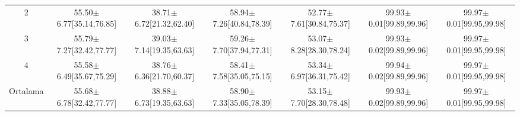 \begin{table}
\begin{adjustbox}{width=\textwidth}
\begin{tabular}{ccccccc}
            2 & 55.50$\pm$6.77[35.14,76.85] & 38.71$\pm$6.72[21.32,62.40] & 58.94$\pm$7.26[40.84,78.39] & 52.77$\pm$7.61[30.84,75.37] & 99.93$\pm$0.01[99.89,99.96] & 99.97$\pm$0.01[99.95,99.98] \\
            3 & 55.79$\pm$7.27[32.42,77.77] & 39.03$\pm$7.14[19.35,63.63] & 59.26$\pm$7.70[37.94,77.31] & 53.07$\pm$8.28[28.30,78.24] & 99.93$\pm$0.02[99.89,99.96] & 99.97$\pm$0.01[99.95,99.98] \\
            4 & 55.58$\pm$6.49[35.67,75.29] & 38.76$\pm$6.36[21.70,60.37] & 58.41$\pm$7.58[35.05,75.15] & 53.34$\pm$6.97[36.31,75.42] & 99.94$\pm$0.02[99.89,99.96] & 99.97$\pm$0.01[99.95,99.98] \\
			\toprule
			Ortalama & 55.68$\pm$6.78[32.42,77.77] & 38.88$\pm$6.73[19.35,63.63] & 58.90$\pm$7.33[35.05,78.39] & 53.15$\pm$7.70[28.30,78.48] & 99.93$\pm$0.02[99.89,99.96] & 99.97$\pm$0.01[99.95,99.98] \\		
			\bottomrule			
		\end{tabular}
	\end{adjustbox}	
\end{table}

